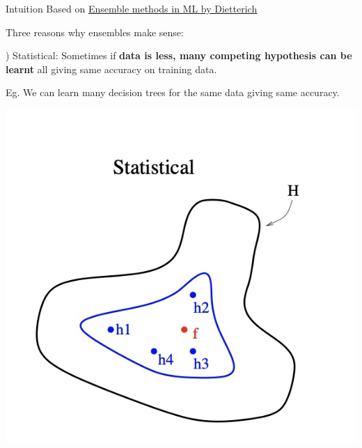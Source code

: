 \documentclass{beamer}
\begin{document}
\begin{frame}{Intuition}
  \pause Based on \hyperlink{https://web.engr.oregonstate.edu/~tgd/publications/mcs-ensembles.pdf}{Ensemble methods in ML by Dietterich}

  Three reasons why ensembles make sense:

  ) Statistical: Sometimes if \textbf{data is less, many competing hypothesis can be learnt} all giving same accuracy on training data.

  \pause Eg. We can learn many decision trees for the same data giving same accuracy.

  \includegraphics[scale=0.2]{../assets/ensemble/diagrams/statistical.jpg}

\end{frame}
  
\end{document}

